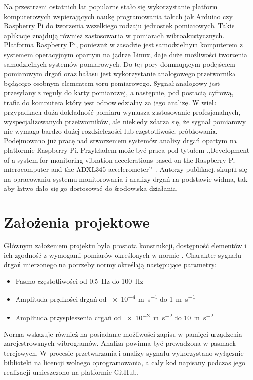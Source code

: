 \documentclass[a4paper,12pt]{mwart}
\begin{document}
Na przestrzeni ostatnich lat popularne stało się wykorzystanie platform
komputerowych wspierających naukę programowania takich jak Arduino czy Raspberry
Pi do tworzenia wszelkiego rodzaju jednostek pomiarowych. Takie aplikacje
znajdują również zastosowania w pomiarach wibroakustycznych. Platforma Raspberry
Pi, ponieważ w zasadzie jest samodzielnym komputerem z systemem operacyjnym
opartym na jądrze Linux, daje duże możliwości tworzenia samodzielnych systemów
pomiarowych. Do tej pory dominującym podejściem pomiarowym drgań oraz hałasu
jest wykorzystanie analogowego przetwornika będącego osobnym elementem toru
pomiarowego. Sygnał analogowy jest przesyłany z reguły do karty pomiarowej, a
następnie, pod postacią cyfrową, trafia do komputera który jest odpowiedzialny
za jego analizę. W wielu przypadkach duża dokładność pomiaru wymusza
zastosowanie profesjonalnych, wyspecjalizowanych przetworników, ale niekiedy
zdarza się, że sygnał pomiarowy nie wymaga bardzo dużej rozdzielczości lub
częstotliwości próbkowania. Podejmowano już pracę nad stworzeniem systemów
analizy drgań opartym na platformie Raspberry Pi. Przykładem może być praca pod
tytułem ,,Development of a system for monitoring vibration accelerations based
on the Raspberry Pi microcomputer and the ADXL345 accelerometer''~\cite{art1}.
Autorzy publikacji skupili się na opracowaniu systemu monitorowania i analizy
drgań na podstawie widma, tak aby łatwo dało się go dostosować do środowiska
działania. 

\section{Założenia projektowe}

Głównym założeniem projektu była prostota konstrukcji, dostępność elementów i
ich zgodność z wymogami pomiarów określonych w normie \cite{norma}. Charakter
sygnału drgań mierzonego na potrzeby normy określają następujące parametry:
\begin{itemize}
  \item Pasmo częstotliwości od \SI{0,5}{\hertz} do \SI{100}{\hertz}
  \item Amplituda prędkości drgań od \SI{e-4}{\metre\per\second} do \SI{1}{\metre\per\second}
  \item Amplituda przyspieszenia drgań od \SI{e-3}{\metre\per\square\second} do \SI{10}{\metre\per\square\second}
\end{itemize}
Norma wskazuje również na posiadanie możliwości zapisu w pamięci urządzenia
zarejestrowanych wibrogramów. Analiza powinna być prowadzona w pasmach
tercjowych. W procesie przetwarzania i analizy sygnału wykorzystano wyłącznie
biblioteki na licencji wolnego oprogramowania, a cały kod napisany podczas jego
realizacji umieszczono na platformie GitHub.
\end{document}

